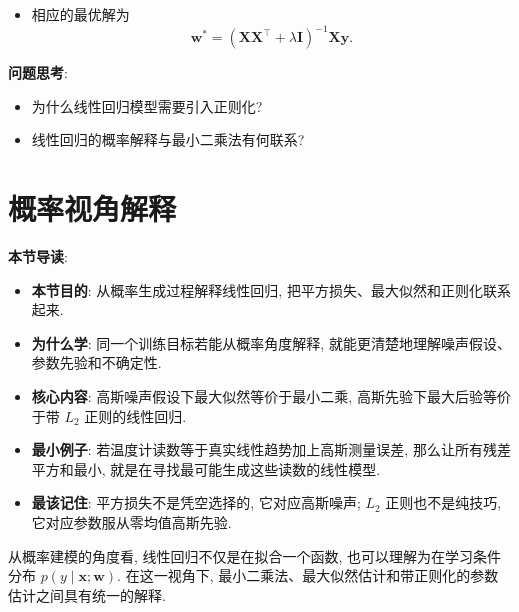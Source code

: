 \documentclass{../nndlcourse}
\begin{document}
\begin{enumerate}
\begin{itemize}
    \item 相应的最优解为
    \begin{equation*}
    \boldsymbol{w}^* = \left(\boldsymbol{X}\boldsymbol{X}^{\top} + \lambda \boldsymbol{I}\right)^{-1} \boldsymbol{X}\boldsymbol{y}.
    \end{equation*}
    \end{itemize}
\end{enumerate}



\textbf{问题思考}: 
\begin{itemize}
    \item 为什么线性回归模型需要引入正则化? 
    \item 线性回归的概率解释与最小二乘法有何联系? 
\end{itemize}
    

\section{概率视角解释}

\textbf{本节导读}:
\begin{itemize}
  \item \textbf{本节目的}: 从概率生成过程解释线性回归, 把平方损失、最大似然和正则化联系起来.
  \item \textbf{为什么学}: 同一个训练目标若能从概率角度解释, 就能更清楚地理解噪声假设、参数先验和不确定性.
  \item \textbf{核心内容}: 高斯噪声假设下最大似然等价于最小二乘, 高斯先验下最大后验等价于带 $L_2$ 正则的线性回归.
  \item \textbf{最小例子}: 若温度计读数等于真实线性趋势加上高斯测量误差, 那么让所有残差平方和最小, 就是在寻找最可能生成这些读数的线性模型.
  \item \textbf{最该记住}: 平方损失不是凭空选择的, 它对应高斯噪声; $L_2$ 正则也不是纯技巧, 它对应参数服从零均值高斯先验.
\end{itemize}

从概率建模的角度看, 线性回归不仅是在拟合一个函数, 也可以理解为在学习条件分布 $p(y \mid \boldsymbol{x}; \boldsymbol{w})$. 在这一视角下, 最小二乘法、最大似然估计和带正则化的参数估计之间具有统一的解释.
\end{document}
